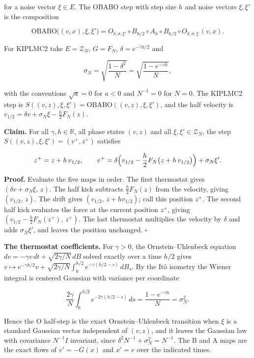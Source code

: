\documentclass[11pt,a4paper]{report}
\begin{document}
for a noise vector \(\xi\in E\). The OBABO step with step size \(h\) and noise vectors \(\xi,\xi'\) is the composition


\[\mathrm{OBABO}\bigl((v,x),\xi,\xi'\bigr)=O_{\delta,\sigma,\xi'}\circ B_{h/2}\circ A_h\circ B_{h/2}\circ O_{\delta,\sigma,\xi}\,(v,x).\]


For KIPLMC2 take \(E=\mathcal Z_N\), \(G=F_N\), \(\delta=e^{-\gamma h/2}\) and


\[\sigma_N=\sqrt{\frac{1-\delta^2}N}=\sqrt{\frac{1-e^{-\gamma h}}N},\]


with the conventions \(\sqrt a=0\) for \(a<0\) and \(N^{-1}=0\) for \(N=0\). The KIPLMC2 step is \(S((v,z),\xi,\xi')=\mathrm{OBABO}((v,z),\xi,\xi')\), and the half velocity is \(v_{1/2}=\delta v+\sigma_N\xi-\frac h2F_N(z)\).




\textbf{Claim.} For all \(\gamma,h\in\mathbb R\), all phase states \((v,z)\) and all \(\xi,\xi'\in\mathcal Z_N\), the step \(S((v,z),\xi,\xi')=(v^+,z^+)\) satisfies


\[z^+=z+h\,v_{1/2},\qquad v^+=\delta\Bigl(v_{1/2}-\frac h2F_N\bigl(z+h\,v_{1/2}\bigr)\Bigr)+\sigma_N\xi'.\]


\textbf{Proof.} Evaluate the five maps in order. The first thermostat gives \((\delta v+\sigma_N\xi,\,z)\). The half kick subtracts \(\frac h2F_N(z)\) from the velocity, giving \((v_{1/2},\,z)\). The drift gives \((v_{1/2},\,z+hv_{1/2})\); call this position \(z^+\). The second half kick evaluates the force at the current position \(z^+\), giving \((v_{1/2}-\frac h2F_N(z^+),\,z^+)\). The last thermostat multiplies the velocity by \(\delta\) and adds \(\sigma_N\xi'\), and leaves the position unchanged. \(\square\)




\textbf{The thermostat coefficients.} For \(\gamma>0\), the Ornstein–Uhlenbeck equation \(dv=-\gamma v\,dt+\sqrt{2\gamma/N}\,dB\) solved exactly over a time \(h/2\) gives \(v\mapsto e^{-\gamma h/2}v+\sqrt{2\gamma/N}\int_0^{h/2}e^{-\gamma(h/2-s)}\,dB_s\). By the Itô isometry the Wiener integral is centered Gaussian with variance per coordinate


\[\frac{2\gamma}N\int_0^{h/2}e^{-2\gamma(h/2-s)}\,ds=\frac{1-e^{-\gamma h}}N=\sigma_N^2.\]


Hence the O half-step is the exact Ornstein–Uhlenbeck transition when \(\xi\) is a standard Gaussian vector independent of \((v,z)\), and it leaves the Gaussian law with covariance \(N^{-1}I\) invariant, since \(\delta^2N^{-1}+\sigma_N^2=N^{-1}\). The B and A maps are the exact flows of \(v'=-G(x)\) and \(x'=v\) over the indicated times.
\end{document}
